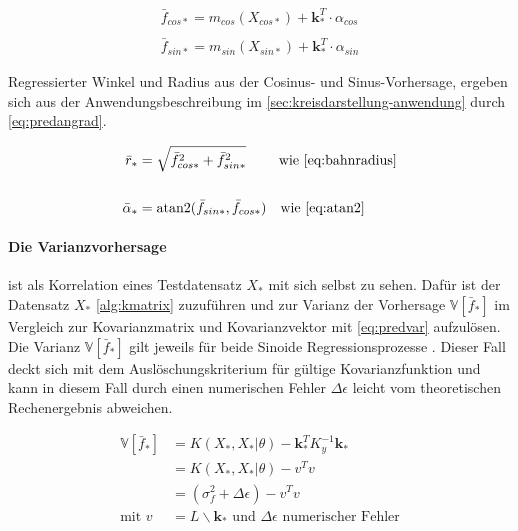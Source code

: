 \begin{align}\label{eq:predmean}
	\bar{f}_{cos*} = m_{cos}(X_{cos*}) + \mathbf{k}_*^T \cdot \alpha_{cos} \nonumber \\
	\\
	\bar{f}_{sin*} = m_{sin}(X_{sin*}) + \mathbf{k}_*^T \cdot \alpha_{sin} \nonumber
\end{align}


Regressierter Winkel und Radius aus der Cosinus- und Sinus-Vorhersage, ergeben sich aus der Anwendungsbeschreibung im \autoref{sec:kreisdarstellung-anwendung} durch \autoref{eq:predangrad}.


\begin{align}\label{eq:predangrad}
	\bar{r}_* &= \sqrt{\bar{f}_{cos*}^2 + \bar{f}_{sin*}^2} \quad\quad\ \text{wie \autoref{eq:bahnradius}} \nonumber \\
	\\
	\bar{\alpha}_* &= \text{atan2}(\bar{f}_{sin*}, \bar{f}_{cos*}) \quad \text{wie \autoref{eq:atan2}} \nonumber
\end{align}


\paragraph*{Die Varianzvorhersage} ist als Korrelation eines Testdatensatz $X_*$ mit sich selbst zu sehen. Dafür ist der Datensatz $X_*$ \autoref{alg:kmatrix} zuzuführen und zur Varianz der Vorhersage $\mathbb{V}\left[ \bar{f}_* \right]$ im Vergleich zur Kovarianzmatrix und Kovarianzvektor mit \autoref{eq:predvar} aufzulösen. Die Varianz $\mathbb{V}\left[ \bar{f}_* \right]$ gilt jeweils für beide Sinoide Regressionsprozesse \cite{Rasmussen2006}. Dieser Fall deckt sich mit dem Auslöschungskriterium für gültige Kovarianzfunktion und kann in diesem Fall durch einen numerischen Fehler $\Delta\epsilon$ leicht vom theoretischen Rechenergebnis abweichen.


\begin{align}\label{eq:predvar}
	\mathbb{V}\left[ \bar{f}_* \right] &= K(X_*, X_*|\theta) - \mathbf{k}_*^T K_y^{-1} \mathbf{k}_* \nonumber \\
									   &= K(X_*, X_*|\theta) - v^T v \\
									   &= (\sigma_f^2 + \Delta\epsilon) - v^T v \nonumber \\
						 \text{mit } v &= L \backslash \mathbf{k}_* \text{ und } \Delta\epsilon \text{ numerischer Fehler} \nonumber
\end{align}


